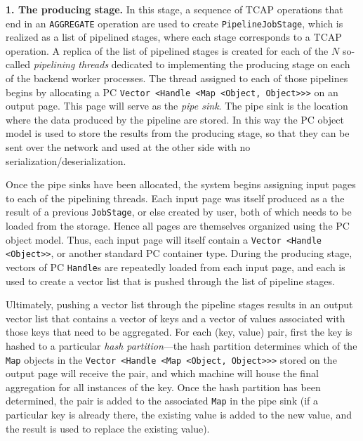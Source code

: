 \vspace{5pt}
{\bf 1. The producing stage.} In this stage, a sequence of TCAP
operations that end in an \texttt{AGGREGATE} operation are used to
create \texttt{PipelineJobStage}, which is 
realized as a list
of pipelined stages, where each stage corresponds to a TCAP operation.
A replica of the list of pipelined stages is
created for each of the $N$ so-called \emph{pipelining threads} dedicated to implementing
the producing stage on each of the backend worker processes.  
The thread assigned to each of those pipelines begins by allocating a PC \texttt{Vector <Handle <Map <Object, Object}\texttt{>}\texttt{>}\texttt{>} on an output page.  This page will serve
as the \emph{pipe sink}.  The pipe sink is
the location where the data produced by the pipeline are stored.  In
this way the PC object model is used to store the results
from the producing stage, so that they can be sent over the network and used at the other side with no serialization/deserialization.

Once the pipe sinks have been allocated,
the system begins assigning input pages to each of the pipelining 
threads.  Each input page was itself produced as a the result of a
previous \texttt{JobStage}, or else created by user, both of which needs to be
loaded from the storage.  Hence all pages are themselves organized using the PC object model.  Thus, each input
page will itself contain a \texttt{Vector <Handle <Object}\texttt{>}\texttt{>},
or another standard PC container type.  During the producing stage, vectors of PC \texttt{Handle}s are repeatedly
loaded from each input page, and each is used to create a vector list that is pushed through the list of pipeline stages.

Ultimately, pushing a vector list through the pipeline stages results in an output vector list that contains a vector of keys and a vector of values 
associated with those keys that need to be aggregated.  
For each (key, value)
pair, first the key is hashed to a particular \emph{hash partition}---the hash partition determines which of the \texttt{Map}
objects in the \texttt{Vector <Handle <Map <Object, Object}\texttt{>}\texttt{>}\texttt{>} stored on the output page will receive the pair, and which machine will house the final aggregation
for all instances of the key.  Once the hash partition has been determined,
the pair is added to the associated \texttt{Map} in the pipe sink
(if a particular key is already there, the
existing value is added to the new value, and the result is used to replace the existing value).  

